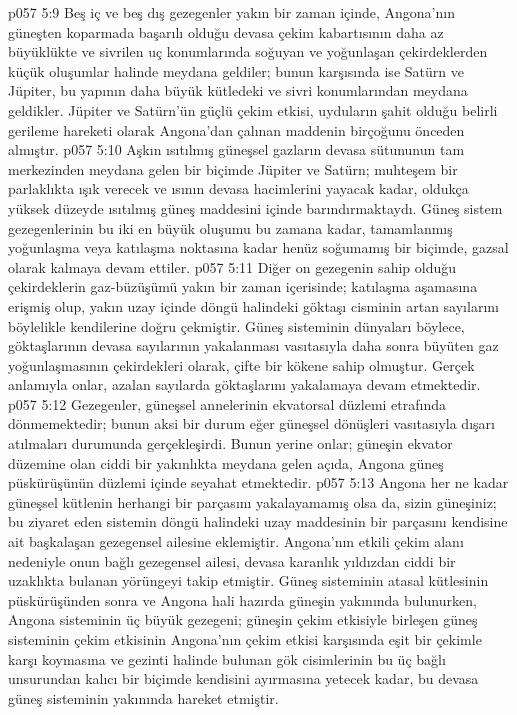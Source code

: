 \vs p057 5:9 Beş iç ve beş dış gezegenler yakın bir zaman içinde, Angona’nın güneşten koparmada başarılı olduğu devasa çekim kabartısının daha az büyüklükte ve sivrilen uç konumlarında soğuyan ve yoğunlaşan çekirdeklerden küçük oluşumlar halinde meydana geldiler; bunun karşısında ise Satürn ve Jüpiter, bu yapının daha büyük kütledeki ve sivri konumlarından meydana geldikler. Jüpiter ve Satürn’ün güçlü çekim etkisi, uyduların şahit olduğu belirli gerileme hareketi olarak Angona’dan çalınan maddenin birçoğunu önceden almıştır.
\vs p057 5:10 Aşkın ısıtılmış güneşsel gazların devasa sütununun tam merkezinden meydana gelen bir biçimde Jüpiter ve Satürn; muhteşem bir parlaklıkta ışık verecek ve ısının devasa hacimlerini yayacak kadar, oldukça yüksek düzeyde ısıtılmış güneş maddesini içinde barındırmaktaydı. Güneş sistem gezegenlerinin bu iki en büyük oluşumu bu zamana kadar, tamamlanmış yoğunlaşma veya katılaşma noktasına kadar henüz soğumamış bir biçimde, gazsal olarak kalmaya devam ettiler.
\vs p057 5:11 Diğer on gezegenin sahip olduğu çekirdeklerin gaz\hyp{}büzüşümü yakın bir zaman içerisinde; katılaşma aşamasına erişmiş olup, yakın uzay içinde döngü halindeki göktaşı cisminin artan sayılarını böylelikle kendilerine doğru çekmiştir. Güneş sisteminin dünyaları böylece, göktaşlarının devasa sayılarının yakalanması vasıtasıyla daha sonra büyüten gaz yoğunlaşmasının çekirdekleri olarak, çifte bir kökene sahip olmuştur. Gerçek anlamıyla onlar, azalan sayılarda göktaşlarını yakalamaya devam etmektedir.
\vs p057 5:12 Gezegenler, güneşsel annelerinin ekvatorsal düzlemi etrafında dönmemektedir; bunun aksi bir durum eğer güneşsel dönüşleri vasıtasıyla dışarı atılmaları durumunda gerçekleşirdi. Bunun yerine onlar; güneşin ekvator düzemine olan ciddi bir yakınlıkta meydana gelen açıda, Angona güneş püskürüşünün düzlemi içinde seyahat etmektedir.
\vs p057 5:13 Angona her ne kadar güneşsel kütlenin herhangi bir parçasını yakalayamamış olsa da, sizin güneşiniz; bu ziyaret eden sistemin döngü halindeki uzay maddesinin bir parçasını kendisine ait başkalaşan gezegensel ailesine eklemiştir. Angona’nın etkili çekim alanı nedeniyle onun bağlı gezegensel ailesi, devasa karanlık yıldızdan ciddi bir uzaklıkta bulanan yörüngeyi takip etmiştir. Güneş sisteminin atasal kütlesinin püskürüşünden sonra ve Angona hali hazırda güneşin yakınında bulunurken, Angona sisteminin üç büyük gezegeni; güneşin çekim etkisiyle birleşen güneş sisteminin çekim etkisinin Angona’nın çekim etkisi karşısında eşit bir çekimle karşı koymasına ve gezinti halinde bulunan gök cisimlerinin bu üç bağlı unsurundan kalıcı bir biçimde kendisini ayırmasına yetecek kadar, bu devasa güneş sisteminin yakınında hareket etmiştir.
